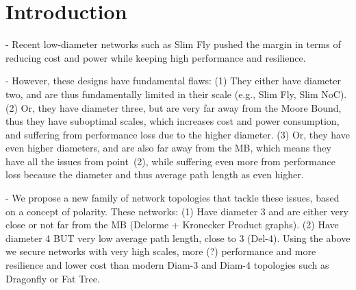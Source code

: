 \section{Introduction}
\label{sec:intro}

- Recent low-diameter networks such as Slim Fly pushed the margin in terms of
  reducing cost and power while keeping high performance and resilience.

- However, these designs have fundamental flaws: 
%
(1) They either have diameter two, and are thus fundamentally limited in their
scale (e.g., Slim Fly, Slim NoC).
%
(2) Or, they have diameter three, but are very far away from the Moore Bound,
thus they have suboptimal scales, which increases cost and power consumption,
and suffering from performance loss due to the higher diameter.
%
(3) Or, they have even higher diameters, and are also far away from the MB,
which means they have all the issues from point~(2), while suffering even more
from performance loss because the diameter and thus average path length as even
higher.

- We propose a new family of network topologies that tackle these issues, based
  on a concept of polarity.  These networks:
%
(1) Have diameter 3 and are either very close or not far from the MB (Delorme +
Kronecker Product graphs).
%
(2) Have diameter 4 BUT very low average path length, close to 3 (Del-4).
%
Using the above we secure networks with very high scales, more (?) performance
and more resilience and lower cost than modern Diam-3 and Diam-4 topologies
such as Dragonfly or Fat Tree.


